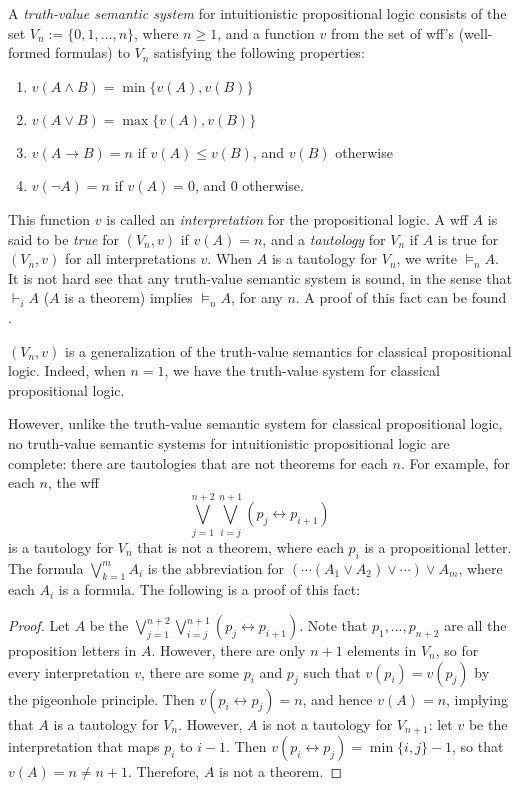 \documentclass[12pt]{article}
\begin{document}
A \emph{truth-value semantic system} for intuitionistic propositional logic consists of the set $V_n:=\lbrace 0, 1, \ldots, n\rbrace$, where $n\ge 1$, and a function $v$ from the set of wff's (well-formed formulas) to $V_n$ satisfying the following properties:
\begin{enumerate}
\item $v(A\land B)= \min\lbrace v(A),v(B)\rbrace$
\item $v(A\lor B)= \max\lbrace v(A),v(B)\rbrace$
\item $v(A\to B)= n$ if $v(A)\le v(B)$, and $v(B)$ otherwise
\item $v(\neg A)= n$ if $v(A)=0$, and $0$ otherwise.
\end{enumerate}
This function $v$ is called an \emph{interpretation} for the propositional logic.  A wff $A$ is said to be \emph{true} for $(V_n,v)$ if $v(A)=n$, and a \emph{tautology} for $V_n$ if $A$ is true for $(V_n,v)$ for all interpretations $v$.  When $A$ is a tautology for $V_n$, we write $\models_n A$.  It is not hard see that any truth-value semantic system is sound, in the sense that $\vdash_i A$ ($A$ is a theorem) implies $\models_n A$, for any $n$.  A proof of this fact can be found .

$(V_n,v)$ is a generalization of the truth-value semantics for classical propositional logic.  Indeed, when $n=1$, we have the truth-value system for classical propositional logic.

However, unlike the truth-value semantic system for classical propositional logic, no truth-value semantic systems for intuitionistic propositional logic are complete: there are tautologies that are not theorems for each $n$.  For example, for each $n$, the wff 
$$ \bigvee_{j=1}^{n+2} \bigvee_{i=j}^{n+1} (p_j \leftrightarrow p_{i+1}) $$
is a tautology for $V_n$ that is not a theorem, where each $p_i$ is a propositional letter.  The formula $\bigvee_{k=1}^m A_i$ is the abbreviation for $(\cdots (A_1 \lor A_2) \lor \cdots ) \lor A_m$, where each $A_i$ is a formula.  The following is a proof of this fact:
\begin{proof}
Let $A$ be the $ \bigvee_{j=1}^{n+2} \bigvee_{i=j}^{n+1} (p_j \leftrightarrow p_{i+1}) $.  Note that $p_1,\ldots, p_{n+2}$ are all the proposition letters in $A$.  However, there are only $n+1$ elements in $V_n$, so for every interpretation $v$, there are some $p_i$ and $p_j$ such that $v(p_i)=v(p_j)$ by the pigeonhole principle.  Then $v(p_i \leftrightarrow p_j)=n$, and hence $v(A)=n$, implying that $A$ is a tautology for $V_n$.  However, $A$ is not a tautology for $V_{n+1}$: let $v$ be the interpretation that maps $p_i$ to $i-1$.  Then $v(p_i \leftrightarrow p_j)=\min\lbrace i,j\rbrace -1$, so that $v(A)=n \ne n+1$.  Therefore, $A$ is not a theorem.
\end{proof}
\end{document}

